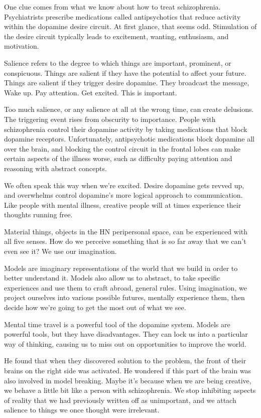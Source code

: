 \documentclass[ebook,12pt,oneside,openany]{memoir}
\begin{document}
One clue comes from what we know about how to treat schizophrenia.
Psychiatrists prescribe medications called antipsychotics that reduce activity within the dopamine desire circuit.
At first glance, that seems odd. Stimulation of the desire circuit typically leads to excitement, wanting, enthusiasm,
and motivation. 

Salience refers to the degree to which things are important, prominent, or conspicuous.
Things are salient if they have the potential to affect your future. Things are salient if they trigger desire dopamine.
They broadcast the message, Wake up. Pay attention. Get excited. This is important.

Too much salience, or any salience at all at the wrong time, can create delusions.
The triggering event rises from obscurity to importance.
People with schizophrenia control their dopamine activity by taking medications that block dopamine receptors.
Unfortunately, antipsychotic medications block dopamine all over the brain,
and blocking the control circuit in the frontal lobes can make certain aspects of the illness worse, such as difficulty paying attention and reasoning
with abstract concepts.

We often speak this way when we're excited. 
Desire dopamine gets revved up, and overwhelms control dopamine's more logical approach to communication.
Like people with mental illness, creative people will at times experience their thoughts running free.

Material things, objects in the HN peripersonal space, can be experienced with all five senses.
How do we perceive something that is so far away that we can't even see it? We use our imagination.

Models are imaginary representations of the world that we build in order to better understand it.
Models also allow us to abstract, to take specific experiences and use them to craft abroad, general rules.
Using imagination, we project ourselves into various possible futures, mentally experience them, then decide 
how we're going to get the most out of what we see. 

Mental time travel is a powerful tool of the dopamine system. 
Models are powerful tools, but they have disadvantages. They can lock us into a particular way of thinking,
causing us to miss out on opportunities to improve the world.

He found that when they discovered solution to the problem, the front of their brains on the right side was activated.
He wondered if this part of the brain was also involved in model breaking.
Maybe it's because when we are being creative, we behave a little bit like a person with schizophrenia.
We stop inhibiting aspects of reality that we had previously written off as unimportant, and we attach salience
to things we once thought were irrelevant.
\end{document}
